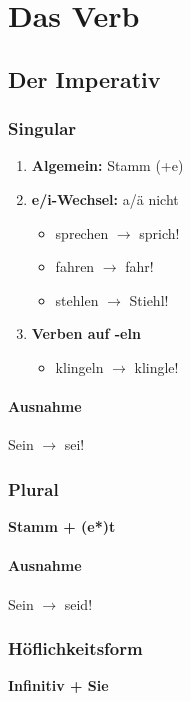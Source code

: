 \documentclass[main.tex]{subfiles}
\begin{document}
\chapter{Das Verb}
\section{Der Imperativ}
\subsection{Singular}
\begin{enumerate}
\item \textbf{Algemein:} Stamm (+e)

\item \textbf{e/i-Wechsel:} a/ä nicht
	\begin{itemize}
	\item sprechen $\rightarrow$ sprich!
	\item fahren $\rightarrow$ fahr!
	\item stehlen $\rightarrow$ Stiehl!
	\end{itemize}

\item \textbf{Verben auf -eln}
	\begin{itemize}
	\item klingeln $\rightarrow$ klingle!
	\end{itemize}
\end{enumerate}
\subsubsection{Ausnahme}
Sein $\rightarrow$ sei!
\subsection{Plural}
\textbf{Stamm + (e*)t}
\subsubsection{Ausnahme}
Sein $\rightarrow$ seid!
\subsection{Höflichkeitsform}
\textbf{Infinitiv + Sie}
\end{document}
